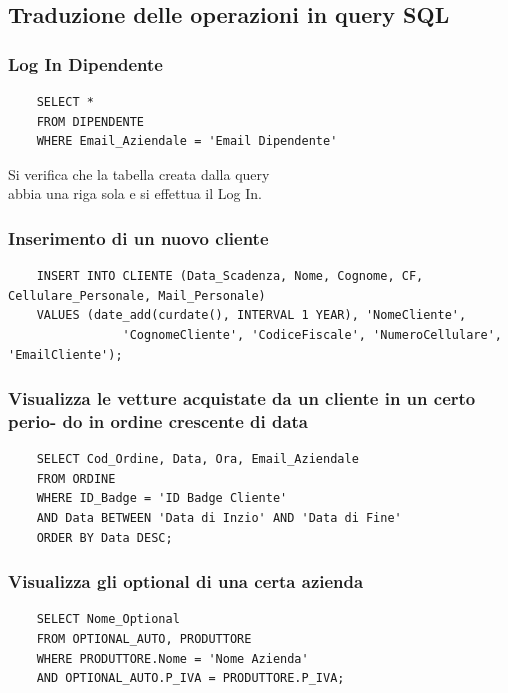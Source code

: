 \documentclass[11pt]{article}
\begin{document}
\subsection{Traduzione delle operazioni in query SQL}

\subsubsection*{Log In Dipendente}

\begin{lstlisting}
    SELECT * 
    FROM DIPENDENTE 
    WHERE Email_Aziendale = 'Email Dipendente'
\end{lstlisting}
Si verifica che la tabella creata dalla query \\
abbia una riga sola e si effettua il Log In.

\subsubsection*{Inserimento di un nuovo cliente}

\begin{lstlisting}
    INSERT INTO CLIENTE (Data_Scadenza, Nome, Cognome, CF, Cellulare_Personale, Mail_Personale)
    VALUES (date_add(curdate(), INTERVAL 1 YEAR), 'NomeCliente', 
                'CognomeCliente', 'CodiceFiscale', 'NumeroCellulare', 'EmailCliente');
\end{lstlisting}

\subsubsection*{Visualizza le vetture acquistate da un cliente in un certo
perio- do in ordine crescente di data}

\begin{lstlisting}
    SELECT Cod_Ordine, Data, Ora, Email_Aziendale 
    FROM ORDINE
    WHERE ID_Badge = 'ID Badge Cliente' 
    AND Data BETWEEN 'Data di Inzio' AND 'Data di Fine'
    ORDER BY Data DESC;
\end{lstlisting}

\subsubsection*{Visualizza gli optional di una certa azienda}
\begin{lstlisting}
    SELECT Nome_Optional
    FROM OPTIONAL_AUTO, PRODUTTORE
    WHERE PRODUTTORE.Nome = 'Nome Azienda'
    AND OPTIONAL_AUTO.P_IVA = PRODUTTORE.P_IVA;
\end{lstlisting}
\end{document}
